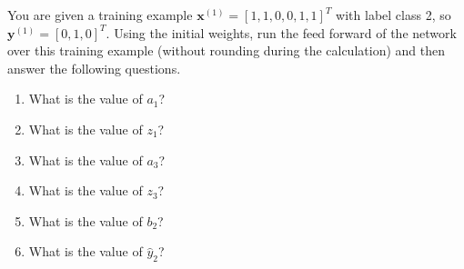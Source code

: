 \documentclass{article}
\newcommand{\xv}{\mathbf{x}}
\newcommand{\yv}{\mathbf{y}}
\theoremstyle{definition}
\theoremstyle{remark}
\newenvironment{Q_nosol}
{%
\clearpage
\item
}
{%
\phantom{s} %
\bigskip
}
\begin{document}
\begin{enumerate}[font={\Large\bfseries},left=0pt]
\begin{Q_nosol}
\begin{enumerate}
    You are given a training example $\xv^{(1)}=[1,1,0,0,1,1]^T$ with label class 2, so $\yv^{(1)}=[0,1,0]^T$. Using the initial weights, run the feed forward of the network over this training example (without rounding during the calculation) and then answer the following questions. 
    
    \begin{enumerate}
        \item What is the value of $a_1$?
        
        \begin{tcolorbox}

        \end{tcolorbox}
        
        
        \item What is the value of $z_1$?
        
        \begin{tcolorbox}

        \end{tcolorbox}
        
        \item What is the value of $a_3$?
        
        \begin{tcolorbox}

        \end{tcolorbox}
    
        
        \item What is the value of $z_3$?
        
        \begin{tcolorbox}

        \end{tcolorbox}
        
        \item What is the value of $b_2$?
        
        \begin{tcolorbox}

        \end{tcolorbox}
        
        
        \item What is the value of $\hat{y}_2$?
        
        \begin{tcolorbox}

        \end{tcolorbox}


\end{enumerate}
\end{enumerate}
\end{Q_nosol}
\end{enumerate}
\end{document}
